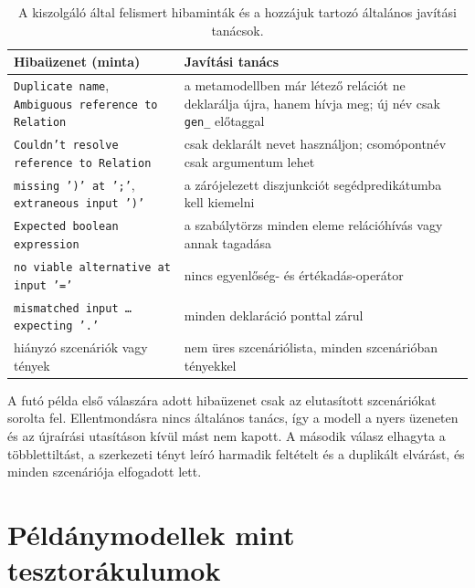 \begin{table}[!ht]
	\footnotesize
	\centering
	\begin{tabular}{>{\raggedright\arraybackslash}p{} >{\raggedright\arraybackslash}p{}}
		\toprule
		Hibaüzenet (minta) & Javítási tanács \\
		\midrule
		\texttt{Duplicate name}, \texttt{Ambiguous reference to Relation} & a metamodellben már létező relációt ne deklarálja újra, hanem hívja meg; új név csak \texttt{gen\_} előtaggal \\
		\texttt{Couldn't resolve reference to Relation} & csak deklarált nevet használjon; csomópontnév csak argumentum lehet \\
		\texttt{missing ')' at ';'}, \texttt{extraneous input ')'} & a zárójelezett diszjunkciót segédpredikátumba kell kiemelni \\
		\texttt{Expected boolean expression} & a szabálytörzs minden eleme relációhívás vagy annak tagadása \\
		\texttt{no viable alternative at input '='} & nincs egyenlőség- és értékadás-operátor \\
		\texttt{mismatched input \dots{} expecting '.'} & minden deklaráció ponttal zárul \\
		hiányzó szcenáriók vagy tények & nem üres szcenáriólista, minden szcenárióban tényekkel \\
		\bottomrule
	\end{tabular}
	\caption{A kiszolgáló által felismert hibaminták és a hozzájuk tartozó általános javítási tanácsok.}
	\label{tab:impl-hints}
\end{table}

A futó példa első válaszára adott hibaüzenet csak az elutasított szcenáriókat sorolta fel. Ellentmondásra nincs általános tanács, így a modell a nyers üzeneten és az újraírási utasításon kívül mást nem kapott. A második válasz elhagyta a többlettiltást, a szerkezeti tényt leíró harmadik feltételt és a duplikált elvárást, és minden szcenáriója elfogadott lett.


\section{Példánymodellek mint tesztorákulumok}
\label{sec:impl-oracle}

